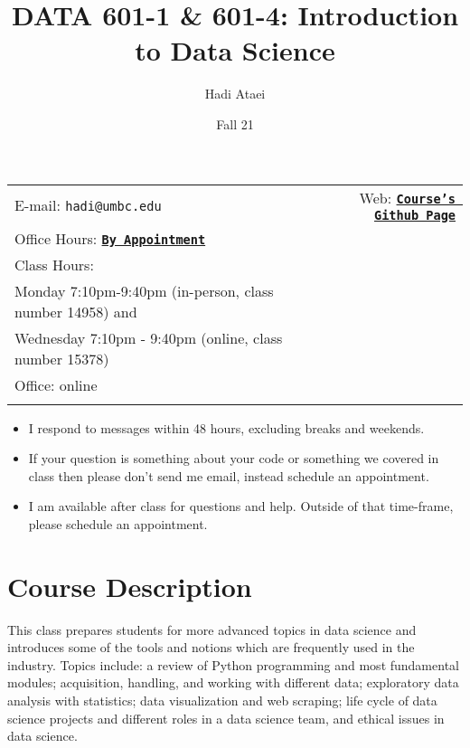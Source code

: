 \documentclass[11pt]{article}
\title{DATA 601-1 \& 601-4: Introduction to Data Science}
\author{Hadi Ataei}
\date{Fall 21}
\newcommand{\blankline}{\quad\pagebreak[2]}
\begin{document}
\maketitle

\blankline

\begin{tabular*}{.93\textwidth}{@{\extracolsep{\fill}}lr}



E-mail: \texttt{hadi@umbc.edu} & Web: \href{https://github.com/hadiataei/601-fall2021}{\tt\bf Course's Github Page}  \\

 Office Hours: \href{https://calendly.com/ataei/15min}{\tt\bf By Appointment} &  \\Class Hours: \\Monday 7:10pm-9:40pm (in-person, class number 14958) and \\Wednesday 7:10pm - 9:40pm (online, class number 15378)\\

 Office: online \\
 & \\
\hline
\end{tabular*}


\vspace{5 mm}

\begin{itemize}
	\item I respond to messages within 48 hours, excluding breaks and weekends.
	\item If your question is something about your code or something we covered in class then please don't send me email, instead schedule an appointment.
	\item I am available after class for questions and help. Outside of that time-frame, please schedule an appointment.
\end{itemize}


\section*{Course Description}

This class prepares students for more advanced topics in data science and introduces some of the tools and notions which are frequently used in the industry. Topics include: a review of Python programming and most fundamental modules; acquisition, handling, and working with different data; exploratory data analysis with statistics; data visualization and web scraping; life cycle of data science projects and different roles in a data science team, and ethical issues in data science.
\end{document}
